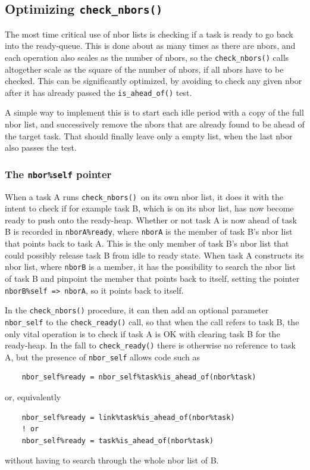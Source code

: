 \documentclass[paper=a4,fontsize=11pt]{scrartcl}
\numberwithin{equation}{section}		%
\numberwithin{figure}{section}			%
\numberwithin{table}{section}				%
\newcommand{\codecolor}{\color{Blue}}
\newcommand{\Code}[1]{{\codecolor\texttt{#1}}}
\def\checkready{\Code{check\_ready()}}
\def\checknbors{\Code{check\_nbors()}}
\def\isaheadof{\Code{is\_ahead\_of()}}
\begin{document}
\subsection{Optimizing \checknbors}
The most time critical use of nbor lists is checking if a task is ready to go back into the ready-queue.  This is done about as many times as there are nbors, and each operation also scales as the number of nbors, so the \checknbors{} calls altogether scale as the square of the number of nbors, if all nbors have to be checked.   This can be significantly optimized, by avoiding to check any given nbor after it has already passed the \isaheadof{} test.

A simple way to implement this is to start each idle period with a copy of the full nbor list, and successively remove the nbors that are already found to be ahead of the target task.  That should finally leave only a empty list, when the last nbor also passes the test.

\subsubsection{The \Code{nbor\%self} pointer}
When a task A runs \checknbors\ on its own nbor list, it does it with the intent to check if for example task B, which is on its nbor list, has now become ready to push onto the ready-heap.  Whether or not task A is now ahead of task B is recorded in \verb|nborA%ready|, where \verb|nborA| is the member of task B's nbor list that points back to task A.  This is the only member of task B's nbor list that could possibly release task B from idle to ready state.  When task A constructs its nbor list, where \verb|nborB| is a member, it has the possibility to search the nbor list of task B and pinpoint the member that points back to itself, setting the pointer \verb|nborB%self => nborA|, so it points back to itself.

In the \checknbors{} procedure, it can then add an optional parameter \verb|nbor_self| to the \checkready{} call, so that when the call refers to task B, the only vital operation is to check if task A is OK with clearing task B for the ready-heap.  In the fall to \checkready{} there is otherwise no reference to task A, but the presence of \verb|nbor_self| allows code such as
{\small\codecolor\begin{verbatim}
    nbor_self%ready = nbor_self%task%is_ahead_of(nbor%task)
\end{verbatim}}
or, equivalently
{\small\codecolor\begin{verbatim}
    nbor_self%ready = link%task%is_ahead_of(nbor%task)
    ! or
    nbor_self%ready = task%is_ahead_of(nbor%task)
\end{verbatim}}
without having to search through the whole nbor list of B.
\end{document}

